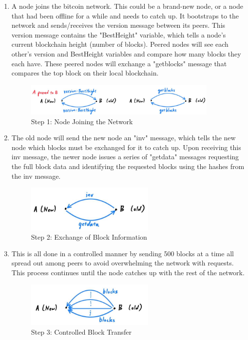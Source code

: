 \documentclass{article}
\begin{document}
    \begin{enumerate}
      \item A node joins the bitcoin network. This could be a brand-new node, or a node that had been offline for a while and needs to catch up. It bootstraps to the network and sends/receives the version message between its peers. This version message contains the "BestHeight" variable, which tells a node's current blockchain height (number of blocks). Peered nodes will see each other's version and BestHeight variables and compare how many blocks they each have. These peered nodes will exchange a "getblocks" message that compares the top block on their local blockchain.
      
      \begin{figure}[H]
      \centering
      \includegraphics[width=0.9\textwidth]{img/step1.jpg}
      \caption{Step 1: Node Joining the Network}
      \end{figure}

      \item The old node will send the new node an "inv" message, which tells the new node which blocks must be exchanged for it to catch up. Upon receiving this inv message, the newer node issues a series of "getdata" messages requesting the full block data and identifying the requested blocks using the hashes from the inv message.
      
      \begin{figure}[H]
      \centering
      \includegraphics[width=0.6\textwidth]{img/step2.jpg}
      \caption{Step 2: Exchange of Block Information}
      \end{figure}

      \item This is all done in a controlled manner by sending 500 blocks at a time all spread out among peers to avoid overwhelming the network with requests. This process continues until the node catches up with the rest of the network.
      
      \begin{figure}[H]
      \centering
      \includegraphics[width=0.6\textwidth]{img/step3.jpg}
      \caption{Step 3: Controlled Block Transfer}
      \end{figure}
    \end{enumerate}
\end{document}
